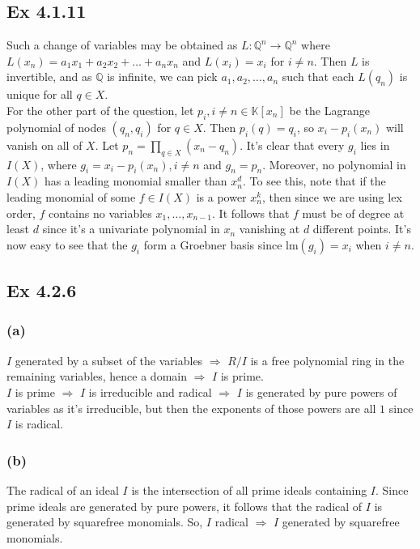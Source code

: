 \documentclass{article}
\theoremstyle{definition}
\newcommand{\Q}{\mathbb{Q}}
\newcommand{\K}{\mathbb{K}}
\newcommand{\lm}{\text{lm}}
\begin{document}
\subsection*{Ex 4.1.11}

Such a change of variables may be obtained as $L : \Q^n \to \Q^n$ where $L(x_n)
= a_1 x_1 + a_2 x_2 + \ldots + a_n x_n$ and $L(x_i) = x_i$ for $i \not = n$.
Then $L$ is invertible, and as $\Q$ is infinite, we can pick $a_1, a_2, \ldots,
a_n$ such that each $L(q_n)$ is unique for all $q \in X$. \\

For the other part of the question, let $p_i, i \not = n \in \K[x_n]$ be the
Lagrange polynomial of nodes $(q_n, q_i)$ for $q \in X$. Then $p_i(q) = q_i$,
so $x_i - p_i(x_n)$ will vanish on all of $X$. Let $p_n = \prod_{q \in X} (x_n
- q_n)$. It's clear that every $g_i$ lies in $I(X)$, where $g_i = x_i -
p_i(x_n), i \not = n$ and $g_n = p_n$. Moreover, no polynomial in $I(X)$ has a
leading monomial smaller than $x_n^d$. To see this, note that if the leading
monomial of some $f \in I(X)$ is a power $x_n^k$, then since we are using lex
order, $f$ contains no variables $x_1, \ldots, x_{n-1}$. It follows that $f$
must be of degree at least $d$ since it's a univariate polynomial in $x_n$
vanishing at $d$ different points. It's now easy to see that the $g_i$ form a
Groebner basis since $\lm(g_i) = x_i$ when $i \not = n$.

\subsection*{Ex 4.2.6}
\subsubsection*{(a)}

$I$ generated by a subset of the variables $\Rightarrow$ $R/I$ is a free
polynomial ring in the remaining variables, hence a domain $\Rightarrow$ $I$ is
prime. \\

$I$ is prime $\Rightarrow$ $I$ is irreducible and radical $\Rightarrow$ $I$ is
generated by pure powers of variables as it's irreducible, but then the
exponents of those powers are all $1$ since $I$ is radical.

\subsubsection*{(b)}

The radical of an ideal $I$ is the intersection of all prime ideals containing
$I$. Since prime ideals are generated by pure powers, it follows that the
radical of $I$ is generated by squarefree monomials. So, $I$ radical
$\Rightarrow$ $I$ generated by squarefree monomials. \\
\end{document}
